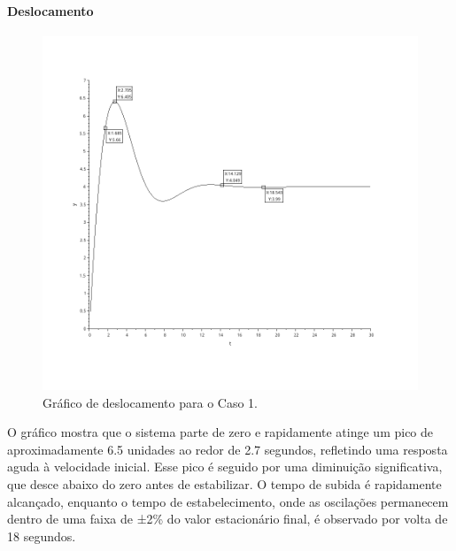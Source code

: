 \paragraph{Deslocamento}
\begin{figure}[H]
    \centering
    \includegraphics[height=0.7\textwidth]{atividades/2-atividade/assets/deslocamento-caso-1.png}
    \caption{Gráfico de deslocamento para o Caso 1.}
\end{figure}
O gráfico mostra que o sistema parte de zero e rapidamente atinge um pico de aproximadamente 6.5 unidades ao redor de 2.7 segundos, refletindo uma resposta aguda à velocidade inicial. Esse pico é seguido por uma diminuição significativa, que desce abaixo do zero antes de estabilizar. O tempo de subida é rapidamente alcançado, enquanto o tempo de estabelecimento, onde as oscilações permanecem dentro de uma faixa de ±2\% do valor estacionário final, é observado por volta de 18 segundos.


